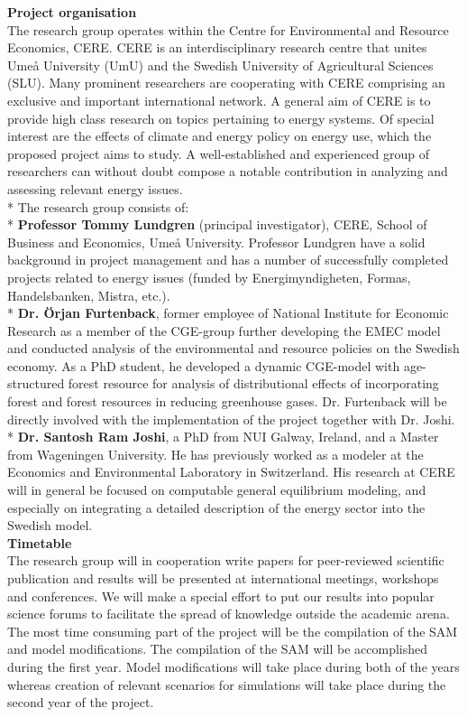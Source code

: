 \textbf{Project organisation}\\
The research group operates within the Centre for Environmental and Resource Economics, CERE. CERE is an interdisciplinary research centre that unites Umeå University (UmU) and the Swedish University of Agricultural Sciences (SLU). Many prominent researchers are cooperating with CERE comprising an exclusive and important international network. A general aim of CERE is to provide high class research on topics pertaining to energy systems. Of special interest are the effects of climate and energy policy on energy use, which the proposed project aims to study. A well-established and experienced group of researchers can without doubt compose a notable contribution in analyzing and assessing relevant energy issues.\\*
The research group consists of:\\*
\textbf{Professor Tommy Lundgren} (principal investigator), CERE, School of Business and Economics, Umeå University. Professor Lundgren have a solid background in project management and has a number of successfully completed projects related to energy issues (funded by Energimyndigheten, Formas, Handelsbanken, Mistra, etc.).\\*
\textbf{Dr. Örjan Furtenback}, former employee of National Institute for Economic Research as a member of the CGE-group further developing the EMEC model and conducted analysis of the environmental and resource policies on the Swedish economy. As a PhD student, he developed a dynamic CGE-model with age-structured forest resource for analysis of distributional effects of incorporating forest and forest resources in reducing greenhouse gases. Dr. Furtenback will be directly involved with the implementation of the project together with Dr. Joshi.\\*
\textbf{Dr. Santosh Ram Joshi}, a PhD from NUI Galway, Ireland, and a Master from Wageningen University. He has previously worked as a modeler at the Economics and Environmental Laboratory in Switzerland. His research at CERE will in general be focused on computable general equilibrium modeling, and especially on integrating a detailed description of the energy sector into the Swedish model.\\

\textbf{Timetable}\\
The research group will in cooperation write papers for peer-reviewed scientific publication and results will be presented at international meetings, workshops and conferences. We will make a special effort to put our results into popular science forums to facilitate the spread of knowledge outside the academic arena.
The most time consuming part of the project will be the compilation of the SAM and model modifications. The compilation of the SAM will be accomplished during the first year. Model modifications will take place during both of the years whereas creation of relevant scenarios for simulations will take place during the second year of the project.\\


